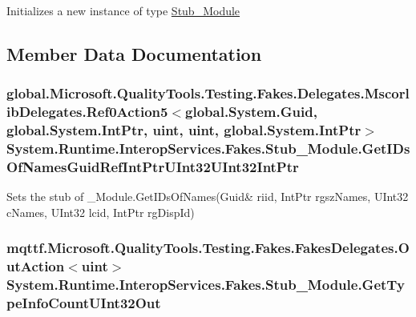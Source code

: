 Initializes a new instance of type \hyperlink{class_system_1_1_runtime_1_1_interop_services_1_1_fakes_1_1_stub___module}{Stub\-\_\-\-Module}



\subsection{Member Data Documentation}
\hypertarget{class_system_1_1_runtime_1_1_interop_services_1_1_fakes_1_1_stub___module_a1e2af23ad0f31b09f481439cc5841d26}{
\subsubsection[{Get\-I\-Ds\-Of\-Names\-Guid\-Ref\-Int\-Ptr\-U\-Int32\-U\-Int32\-Int\-Ptr}]{\setlength{\rightskip}{0pt plus 5cm}global.\-Microsoft.\-Quality\-Tools.\-Testing.\-Fakes.\-Delegates.\-Mscorlib\-Delegates.\-Ref0\-Action5$<$global.\-System.\-Guid, global.\-System.\-Int\-Ptr, uint, uint, global.\-System.\-Int\-Ptr$>$ System.\-Runtime.\-Interop\-Services.\-Fakes.\-Stub\-\_\-\-Module.\-Get\-I\-Ds\-Of\-Names\-Guid\-Ref\-Int\-Ptr\-U\-Int32\-U\-Int32\-Int\-Ptr}}\label{class_system_1_1_runtime_1_1_interop_services_1_1_fakes_1_1_stub___module_a1e2af23ad0f31b09f481439cc5841d26}


Sets the stub of \-\_\-\-Module.\-Get\-I\-Ds\-Of\-Names(Guid\& riid, Int\-Ptr rgsz\-Names, U\-Int32 c\-Names, U\-Int32 lcid, Int\-Ptr rg\-Disp\-Id)

\hypertarget{class_system_1_1_runtime_1_1_interop_services_1_1_fakes_1_1_stub___module_a280ffd7d37787c82b9b2478420b08f80}{
\subsubsection[{Get\-Type\-Info\-Count\-U\-Int32\-Out}]{\setlength{\rightskip}{0pt plus 5cm}mqttf.\-Microsoft.\-Quality\-Tools.\-Testing.\-Fakes.\-Fakes\-Delegates.\-Out\-Action$<$uint$>$ System.\-Runtime.\-Interop\-Services.\-Fakes.\-Stub\-\_\-\-Module.\-Get\-Type\-Info\-Count\-U\-Int32\-Out}}\label{class_system_1_1_runtime_1_1_interop_services_1_1_fakes_1_1_stub___module_a280ffd7d37787c82b9b2478420b08f80}


